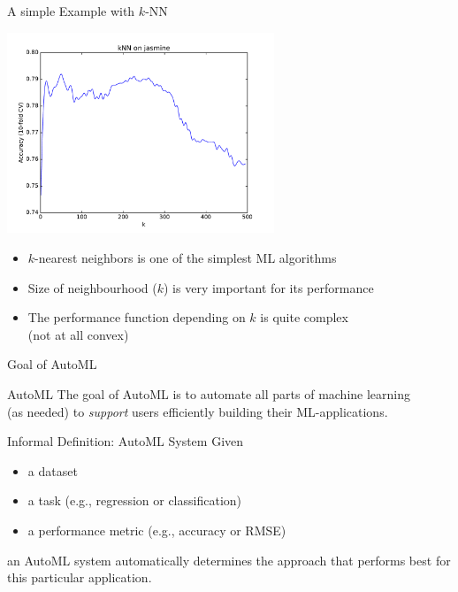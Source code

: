 \begin{frame}[c]{A simple Example with $k$-NN}

\centering
\includegraphics[width=0.6\textwidth]{images/kNN-jasmine}

\begin{itemize}
  \item $k$-nearest neighbors is one of the simplest ML algorithms
  \item Size of neighbourhood ($k$) is very important for its performance
  \item The performance function depending on $k$ is quite complex\\ (not at all convex)
\end{itemize}

\end{frame}
\begin{frame}[c]{Goal of AutoML}

\begin{block}{AutoML}
The goal of AutoML is to automate all parts of machine learning\\ (as needed)
to \emph{support} users efficiently building their ML-applications.
\end{block}

\bigskip
\pause

\begin{block}{Informal Definition: AutoML System}
Given
\begin{itemize}
  \item a dataset
  \item a task (e.g., regression or classification)
  \item a performance metric (e.g., accuracy or RMSE)
\end{itemize}
an AutoML system automatically determines the approach 
that performs best for this particular application.
\end{block}

\end{frame}
